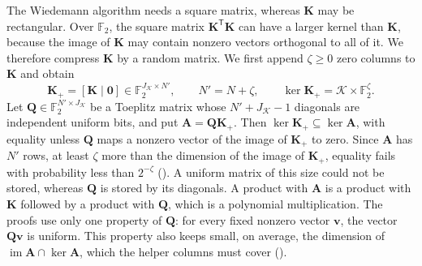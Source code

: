 \documentclass[b5paper, 10pt, abstract=true, captions=tableheading]{scrartcl}
\theoremstyle{plain}
\theoremstyle{definition}
\newcommand{\FF}{\mathds{F}}
\newcommand{\tr}{\mathsf{T}}
\renewcommand{\vec}[1]{\symbf{#1}}
\newcommand{\mat}[1]{\symbf{#1}}
\newcommand{\calK}{\mathcal{K}}
\begin{document}
The Wiedemann algorithm needs a square matrix, whereas $\mat K$ may be
rectangular. Over $\FF_2$, the square matrix $\mat K^\tr\mat K$ can
have a larger kernel than $\mat K$, because the image of $\mat K$ may
contain nonzero vectors orthogonal to all of it. We therefore compress
$\mat K$ by a random matrix. We first append $\zeta\geq0$ zero columns to
$\mat K$ and obtain
\[
  \mat K_+=[\mat K\mid\mat 0]\in\FF_2^{J_{\calK}\times N'},
  \qquad N'=N+\zeta,
  \qquad \ker\mat K_+=\calK\times\FF_2^{\zeta}.
\]
Let $\mat Q\in\FF_2^{N'\times J_{\calK}}$ be a Toeplitz matrix whose
$N'+J_{\calK}-1$ diagonals are independent uniform bits, and put
$\mat A=\mat Q\mat K_+$. Then $\ker\mat K_+\subseteq\ker\mat A$, with
equality unless $\mat Q$ maps a nonzero vector of the image of $\mat K_+$
to zero. Since $\mat A$ has $N'$ rows, at least $\zeta$ more than the
dimension of the image of $\mat K_+$, equality fails with probability less
than $2^{-\zeta}$ (). A uniform matrix of
this size could not be stored, whereas $\mat Q$ is stored by its
diagonals. A product with $\mat A$ is a product
with $\mat K$ followed by a product with $\mat Q$, which is a polynomial
multiplication. The proofs use only one property of $\mat Q$: for every
fixed nonzero vector $\vec v$, the vector $\mat Q\vec v$ is uniform.
This property also keeps small, on average, the
dimension of $\operatorname{im}\mat A\cap\ker\mat A$, which the helper
columns must cover ().
\end{document}
